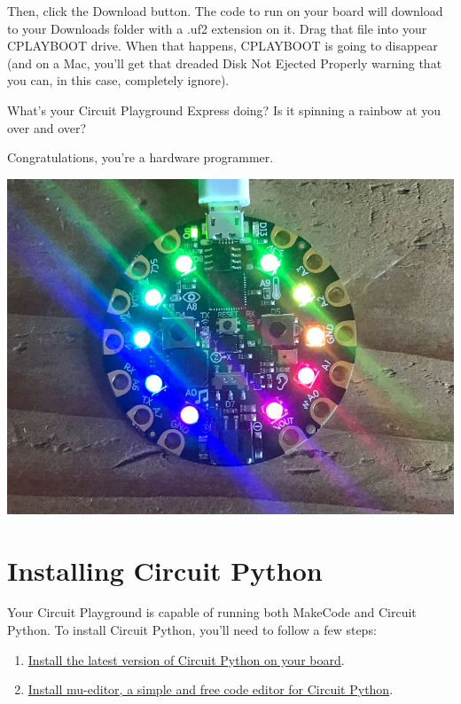 \documentclass[
]{book}
\providecommand{\tightlist}{%
  \setlength{\itemsep}{0pt}\setlength{\parskip}{0pt}}
\begin{document}
Then, click the Download button. The code to run on your board will download to your Downloads folder with a .uf2 extension on it. Drag that file into your CPLAYBOOT drive. When that happens, CPLAYBOOT is going to disappear (and on a Mac, you'll get that dreaded Disk Not Ejected Properly warning that you can, in this case, completely ignore).

What's your Circuit Playground Express doing? Is it spinning a rainbow at you over and over?

Congratulations, you're a hardware programmer.

\includegraphics[width=1\linewidth]{images/01image5}

\hypertarget{installing-circuit-python}{%
\section{Installing Circuit Python}\label{installing-circuit-python}}

Your Circuit Playground is capable of running both MakeCode and Circuit Python. To install Circuit Python, you'll need to follow a few steps:

\begin{enumerate}
\def\labelenumi{\arabic{enumi}.}
\tightlist
\item
  \href{https://learn.adafruit.com/adafruit-circuit-playground-express/circuitpython-quickstart}{Install the latest version of Circuit Python on your board}.
\item
  \href{https://learn.adafruit.com/adafruit-circuit-playground-express/installing-mu-editor}{Install mu-editor, a simple and free code editor for Circuit Python}.
\end{enumerate}
\end{document}
